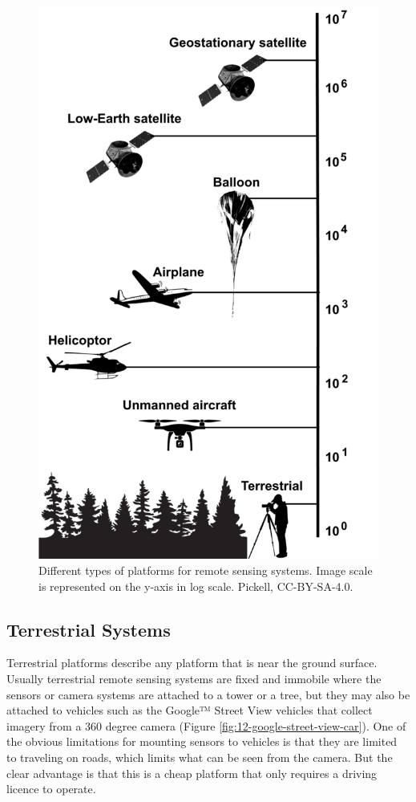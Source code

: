 \documentclass[
]{book}
\begin{document}
\begin{figure}
\includegraphics[width=0.9\linewidth]{images/12-platforms} \caption{Different types of platforms for remote sensing systems. Image scale is represented on the y-axis in log scale. Pickell, CC-BY-SA-4.0.}\label{fig:12-platforms}
\end{figure}

\hypertarget{terrestrial-systems}{%
\subsection{Terrestrial Systems}\label{terrestrial-systems}}

Terrestrial platforms describe any platform that is near the ground surface. Usually terrestrial remote sensing systems are fixed and immobile where the sensors or camera systems are attached to a tower or a tree, but they may also be attached to vehicles such as the Google™ Street View vehicles that collect imagery from a 360 degree camera (Figure \ref{fig:12-google-street-view-car}). One of the obvious limitations for mounting sensors to vehicles is that they are limited to traveling on roads, which limits what can be seen from the camera. But the clear advantage is that this is a cheap platform that only requires a driving licence to operate.
\end{document}
